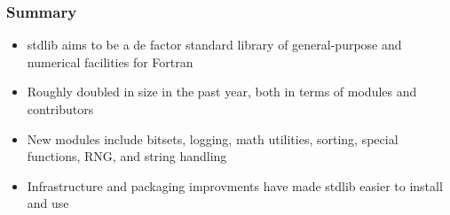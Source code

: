 \documentclass[aspectratio=169]{beamer}
\begin{document}
\begin{frame}
  \frametitle{Summary}

  \begin{itemize}
  \item stdlib aims to be a de factor standard library of general-purpose and numerical facilities for Fortran
  \item Roughly doubled in size in the past year, both in terms of modules and contributors
  \item New modules include bitsets, logging, math utilities, sorting, special functions, RNG, and string handling
  \item Infrastructure and packaging improvments have made stdlib easier to install and use
  \end{itemize}
\end{frame}
\end{document}
